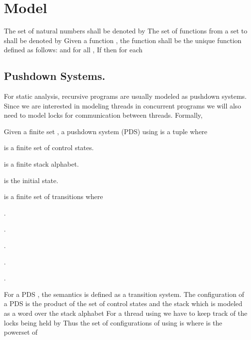 \documentclass{LMCS}
\begin{document}
\begin{comment}
Notice that despite having synchronized blocks, the {\texttt wait()} statement forces releases of locks in a non-nested
fashion (as it exhibits the sequence \emph{acq lock\_done; acq lock\_r; rel lock\_done; acq lock\_done; rel lock\_r; rel lock\_done;}).
However, note that the code above does satisfy \emph{contextual locking}; the locks  acquires are all released before the
exit, because of the synchronized-statements.

We believe that contextual locking is hence a natural restriction that is adhered to in many programs, and hence
establishing pairwise reachability to be decidable for such programs is interesting.
\end{comment}
\section{Model}
\label{sec:model}
The set of natural numbers shall be denoted by  The set of functions from a set  to  shall be denoted by  Given a function , the function  shall be the unique function  defined as follows:
 and for all ,  If  then  for each  



\subsection{Pushdown Systems.} For static analysis,  recursive programs are usually modeled as pushdown systems.
Since we are interested in modeling threads in concurrent programs we will also need to model locks for communication between threads.
Formally,

\begin{definition}
Given a finite set , a pushdown system (PDS)  using 
is a tuple  where

\begin{iteMize}{}
\item  is a  finite set of control states.
\item  is a finite stack alphabet.
\item  is the initial state.
\item  is a finite set of
   transitions where
   \begin{iteMize}{}
   \item .
   \item .
   \item .
   \item .
   \item .

   \end{iteMize}
 \end{iteMize}
 \end{definition}
For a PDS , the semantics is defined as a transition system.
The configuration of a PDS  is the product of the set of control states  and the stack which is modeled
as a word over the stack alphabet   For a thread  using  we have to keep track of the locks being held by 
 Thus
  the set of configurations  of   using  is  
 where   is the powerset of 
\end{document}
